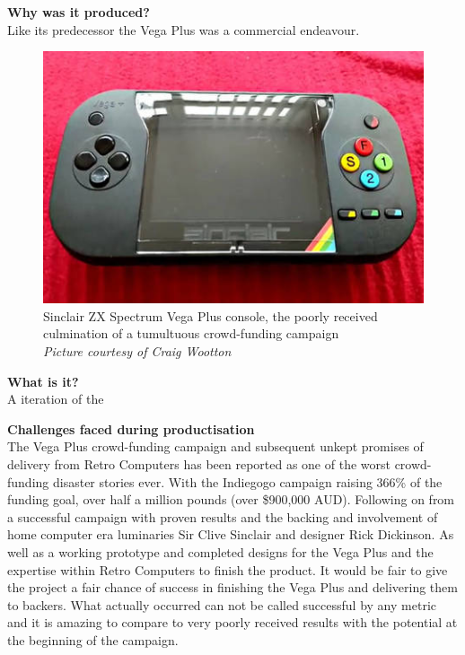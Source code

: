 \textbf{Why was it produced?}\\
Like its predecessor the Vega Plus was a commercial endeavour. 

\begin{figure} \begin{center}
\includegraphics[width=.3\linewidth]{pics/Spectrum_vega_plus} 
\end{center} 
\caption{Sinclair ZX Spectrum Vega Plus console, the poorly received culmination of a tumultuous crowd-funding campaign  \\ \textit{\small{Picture courtesy of Craig Wootton}}}
\label{Spectrum_Vega_Plus}
\end{figure} 

\textbf{What is it?}\\
A iteration of the 

\textbf{Challenges faced during productisation}\\
The Vega Plus crowd-funding campaign and subsequent unkept promises of delivery from Retro Computers has been reported as one of the worst crowd-funding disaster stories ever. With the Indiegogo campaign raising 366\% of the funding goal, over half a million pounds (over \$900,000 AUD). Following on from a successful campaign with proven results and the backing and involvement of home computer era luminaries Sir Clive Sinclair and designer Rick Dickinson. As well as a working prototype and completed designs for the Vega Plus and the expertise within Retro Computers to finish the product. It would be fair to give the project a fair chance of success in finishing the Vega Plus and delivering them to backers. What actually occurred can not be called successful by any metric and it is amazing to compare to very poorly received results with the potential at the beginning of the campaign.  


